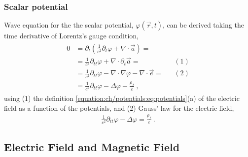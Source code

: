 \documentclass[letterpaper,10pt,english]{jupyterBook}
\begin{document}
\subsubsection{Scalar potential}
\label{\detokenize{ch/waves-equation:scalar-potential}}
\sphinxAtStartPar
Wave equation for the the scalar potential, \(\varphi(\vec{r},t)\), can be derived taking the time derivative of Lorentz’s gauge condition,
\begin{equation*}
\begin{split}\begin{aligned}
 0 & = \partial_t \left(\frac{1}{c^2} \partial_t \varphi + \nabla \cdot \vec{a} \right) = \\
   & = \frac{1}{c^2} \partial_{tt} \varphi + \nabla \cdot \partial_t \vec{a} = && (1) \\
   & = \frac{1}{c^2} \partial_{tt} \varphi - \nabla \cdot \nabla \varphi - \nabla \cdot \vec{e} = && (2) \\
   & = \frac{1}{c^2} \partial_{tt} \varphi - \Delta \varphi - \frac{\rho_f}{\varepsilon} \ ,
\end{aligned}\end{split}
\end{equation*}
\sphinxAtStartPar
using (1) the definition \eqref{equation:ch/potentials:eq:potentials}(a)  of the electric field as a function of the potentials, and (2) Gauss’ law for the electric field,
\begin{equation}\label{equation:ch/waves-equation:eq:wave:phi}
\begin{split} \frac{1}{c^2} \partial_{tt} \varphi - \Delta \varphi = \frac{\rho_f}{\varepsilon} \ .\end{split}
\end{equation}

\subsection{Electric Field and Magnetic Field}
\label{\detokenize{ch/waves-equation:electric-field-and-magnetic-field}}
\end{document}
